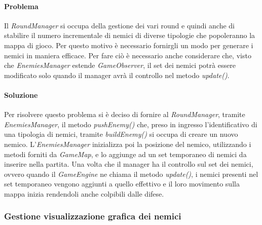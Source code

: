 \documentclass[a4paper,12pt]{report}
\begin{document}
\paragraph{Problema} Il \textit{RoundManager} si occupa della gestione dei vari round e quindi anche di stabilire il numero incrementale di nemici di diverse tipologie che popoleranno la mappa di gioco. Per questo motivo è necessario fornirgli un modo per generare i nemici in maniera efficace. Per fare ciò è necessario anche considerare che, visto che \textit{EnemiesManager} estende \textit{GameObserver}, il set dei nemici potrà essere modificato solo quando il manager avrà il controllo nel metodo \textit{update()}.

\paragraph{Soluzione} Per risolvere questo problema si è deciso di fornire al \textit{RoundManager}, tramite \textit{EnemiesManager}, il metodo \textit{pushEnemy()} che, preso in ingresso l'identificativo di una tipologia di nemici, tramite \textit{buildEnemy()} si occupa di creare un nuovo nemico. L'\textit{EnemiesManager} inizializza poi la posizione del nemico, utilizzando i metodi forniti da \textit{GameMap}, e lo aggiunge ad un set temporaneo di nemici da inserire nella partita. Una volta che il manager ha il controllo sul set dei nemici, ovvero quando il \textit{GameEngine} ne chiama il metodo \textit{update()}, i nemici presenti nel set temporaneo vengono aggiunti a quello effettivo e il loro movimento sulla mappa inizia rendendoli anche colpibili dalle difese.

\subsubsection{Gestione visualizzazione grafica dei nemici}
\end{document}
